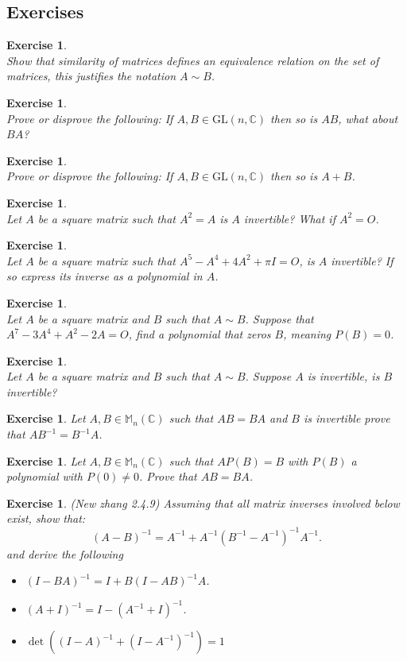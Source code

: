 \documentclass[12pt]{article}
\theoremstyle{definition}
\theoremstyle{remark}
\theoremstyle{plain}
\newtheorem{ex}[subsubsection]{Exercise}
\begin{document}
\subsection{Exercises}
\begin{ex}\leavevmode \\
Show that similarity of matrices defines an equivalence relation on the set of matrices, this justifies the notation $ A \sim B $.
\end{ex}
\begin{ex}\leavevmode \\
Prove or disprove the following: If $A,B \in \mathrm{GL}(n,\mathbb{C})$ then so is $AB$, what about $BA$?
\end{ex}
\begin{ex}\leavevmode \\
	Prove or disprove the following: If $A,B \in \mathrm{GL}(n,\mathbb{C})$ then so is $ A+B $.
\end{ex}
\begin{ex}\leavevmode \\
Let $A$ be a square matrix such that $ A^2=A $ is $A$ invertible? What if $ A^2=O $.
\end{ex}
\begin{ex}\leavevmode \\
	Let $A$ be a square matrix such that $A^{5} - A^{4} + 4A^{2}+ \pi I=O$, is $A$ invertible? If so express its inverse as a polynomial in $A$.

\end{ex}
\begin{ex}\leavevmode \\
Let $ A $ be a square matrix and $ B $ such that $ A\sim B $. Suppose that $ A^7-3A^4+A^2-2A=O $, find a polynomial that zeros $B$, meaning $ P(B)=0 $.
\end{ex}
\begin{ex}\leavevmode \\
Let $A$ be a square matrix and $B$ such that $ A \sim B $. Suppose $A$ is invertible, is $ B $ invertible?
\end{ex}
\begin{ex}
   Let $A,B\in \mathbb{M}_n(\mathbb{C})$ such that $AB=BA$ and $B$ is invertible prove that $AB^{-1}=B^{-1}A$.
\end{ex}
\begin{ex}
    Let $A,B\in \mathbb{M}_n(\mathbb{C})$ such that $AP(B)=B$ with $P(B)$ a polynomial with $P(0)\neq0$. Prove that $AB=BA$.
\end{ex}
\begin{ex}(New zhang 2.4.9)
Assuming that all matrix inverses involved below exist, show that:
$$(A-B)^{-1}=A^{-1}+A^{-1}(B^{-1}-A^{-1})^{-1}A^{-1}.$$
and derive the following
\begin{itemize}
    \item $(I-BA)^{-1}=I+B(I-AB)^{-1}A$.
    \item $(A+I)^{-1}=I-(A^{-1}+I)^{-1}$.
    \item $\det((I-A)^{-1}+(I-A^{-1})^{-1})=1$
\end{itemize}
\end{ex}
\end{document}
